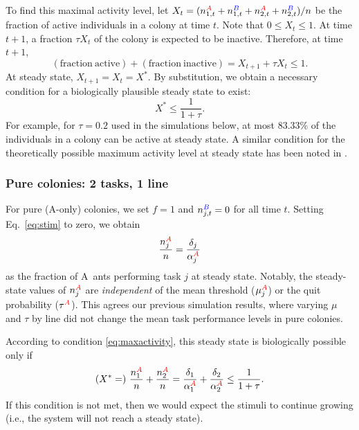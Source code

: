 \documentclass[11pt]{article}
\newcommand{\A}{{\color{red}A}}
\newcommand{\B}{{\color{blue}B}}
\begin{document}
\begin{appendices}
To find this maximal activity level, let $X_t = (n_{1,t}^{\A}+ n_{1,t}^{\B}+ n_{2,t}^{\A}+n_{2,t}^{\B})/n$ be the fraction of active individuals in a colony at time $t$. Note that $0\leq X_t\leq 1$. At time $t+1$, a fraction $\tau X_t$ of the colony is expected to be inactive. Therefore, at time $t+1$,
\begin{equation}
    \mathrm{(fraction\ active)} + \mathrm{(fraction\ inactive)}  = X_{t+1} + \tau X_t \leq 1.
\end{equation}
At steady state, $X_{t+1} = X_{t} = X^*$. By substitution, we obtain a necessary condition for a biologically plausible steady state to exist:
\begin{equation}
    X^* \leq \frac{1}{1+\tau}. \label{eq:maxactivity}
\end{equation}
For example, for $\tau = 0.2$ used in the simulations below, at most $83.33$\% of the individuals in a colony can be active at steady state.
A similar condition for the theoretically possible maximum activity level at steady state has been noted in \cite{gautrais02}.

\subsubsection{Pure colonies: 2 tasks, 1 line} \label{sec:pure}
For pure (\A-only) colonies, we set $f = 1$ and $n_{j,t}^{\B} = 0$ for all time $t$. Setting Eq.~\eqref{eq:stim} to zero, we obtain
\begin{equation}
    \frac{n_j^{\A}}{n} = \frac{\delta_j}{\alpha_j^{\A}}
    \label{eq:ss1}
\end{equation}
as the fraction of \A\ ants performing task $j$ at steady state.
Notably, the steady-state values of $n_j^{\A}$ are \textit{independent} of the mean threshold ($\mu_j^{\A}$) or the quit probability ($\tau^{\A}$). This agrees our previous simulation results, where varying $\mu$ and $\tau$ by line did not change the mean task performance levels in pure colonies.

According to condition \eqref{eq:maxactivity}, this steady state is biologically possible only if
\begin{equation}
    (X^* =)\ \frac{n_1^{\A}}{n} + \frac{n_2^{\A}}{n} = \frac{\delta_1}{\alpha_1^{\A}} + \frac{\delta_2}{\alpha_2^{\A} }\leq \frac{1}{1+\tau} \label{eq:cond1}.
\end{equation}
If this condition is not met, then we would expect the stimuli to continue growing (i.e., the system will not reach a steady state).


\end{appendices}
\end{document}
